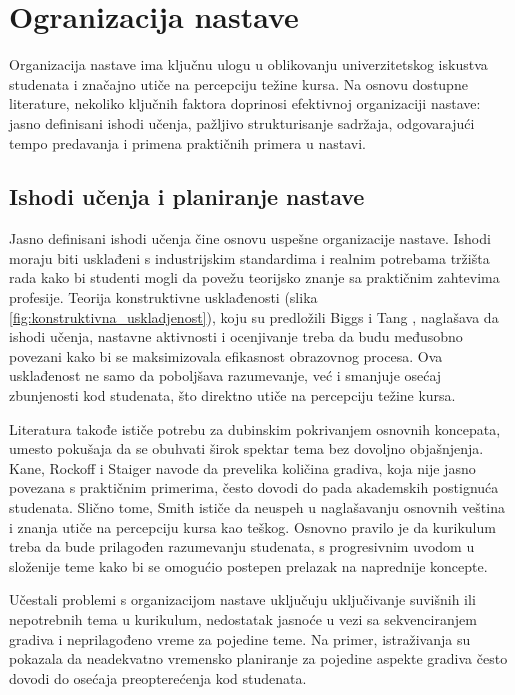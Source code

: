 \documentclass[a4paper]{article}
\begin{document}
\section{Ogranizacija nastave}
Organizacija nastave ima ključnu ulogu u oblikovanju univerzitetskog iskustva studenata i
značajno utiče na percepciju težine kursa. Na osnovu dostupne literature, nekoliko ključnih
faktora doprinosi efektivnoj organizaciji nastave: jasno definisani ishodi učenja, pažljivo
strukturisanje sadržaja, odgovarajući tempo predavanja i primena praktičnih primera u
nastavi.

\subsection{Ishodi učenja i planiranje nastave}
Jasno definisani ishodi učenja čine osnovu uspešne organizacije nastave. Ishodi moraju biti
usklađeni s industrijskim standardima i realnim potrebama tržišta rada kako bi studenti mogli
da povežu teorijsko znanje sa praktičnim zahtevima profesije. Teorija konstruktivne
usklađenosti (slika \ref{fig:konstruktivna_uskladjenost}), koju su predložili Biggs i Tang \cite{biggs2007teaching}, naglašava da ishodi učenja, nastavne
aktivnosti i ocenjivanje treba da budu međusobno povezani kako bi se maksimizovala
efikasnost obrazovnog procesa. Ova usklađenost ne samo da poboljšava razumevanje, već i
smanjuje osećaj zbunjenosti kod studenata, što direktno utiče na percepciju težine kursa.

Literatura takođe ističe potrebu za dubinskim pokrivanjem osnovnih koncepata, umesto
pokušaja da se obuhvati širok spektar tema bez dovoljno objašnjenja. Kane, Rockoff i
Staiger \cite{kane2006certification} navode da prevelika količina gradiva, koja nije jasno povezana s praktičnim
primerima, često dovodi do pada akademskih postignuća studenata. Slično tome, Smith
\cite{smith2009simulation} ističe da neuspeh u naglašavanju osnovnih veština i znanja utiče na percepciju kursa
kao teškog. Osnovno pravilo je da kurikulum treba da bude prilagođen razumevanju
studenata, s progresivnim uvodom u složenije teme kako bi se omogućio postepen prelazak
na naprednije koncepte.

Učestali problemi s organizacijom nastave uključuju uključivanje suvišnih ili nepotrebnih
tema u kurikulum, nedostatak jasnoće u vezi sa sekvenciranjem gradiva i neprilagođeno
vreme za pojedine teme. Na primer, istraživanja su pokazala da neadekvatno vremensko
planiranje za pojedine aspekte gradiva često dovodi do osećaja preopterećenja kod
studenata.
\end{document}
